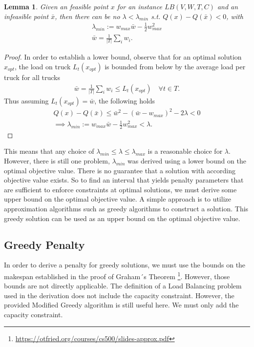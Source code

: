 \documentclass[12pt]{article}
\newtheorem{lemma}[theorem]{Lemma}
\begin{document}
\begin{lemma}
Given an feasible point $x$ for an instance $LB(V, W, T, C)$ and an infeasible point $\bar{x}$, then there can be no $\lambda < \lambda_{min}$ s.t. $Q(x) - Q(\bar{x}) < 0$, with
\begin{gather}
\lambda_{min} := w_{max}\bar{w} - \frac{1}{2} w_{max}^2 \\
\bar{w} = \frac{1}{|T|} \sum_{i} w_i.
\end{gather}
\end{lemma}
\begin{proof}
In order to establish a lower bound, observe that for an  optimal solution $x_{opt}$, the load on truck $L_t(x_{opt})$  is bounded from below by the average load per truck for all trucks
\begin{gather*}
\bar{w} = \frac{1}{|T|} \sum_{i} w_i \leq L_t(x_{opt}) \quad \forall t \in T.
\end{gather*}
Thus assuming $L_t(x_{opt}) = \bar{w}$, the following holds
\begin{gather*}
Q(x) - Q(\bar{x}) \leq \bar{w}^2 - (\bar{w} - w_{max})^2 - 2\lambda < 0 \\
\implies \lambda_{min} := w_{max}\bar{w} - \frac{1}{2} w_{max}^2 < \lambda.
\end{gather*}

\end{proof}


\noindent
This means that any choice of $\lambda_{min} \leq \lambda \leq \lambda_{max}$ is a reasonable choice for $\lambda$.
However, there is still one problem, $\lambda_{min}$ was derived using a lower bound on the optimal objective value.
There is no guarantee that a solution with according objective value exists.
So to find an interval that yields penalty parameters that are sufficient to enforce constraints at optimal solutions, we must derive some upper bound on the optimal objective value.
A simple approach is to utilize approximation algorithms such as greedy algorithms to construct a solution.
This greedy solution can be used as an upper bound on the optimal objective value.
 
\subsection{Greedy Penalty}
In order to derive a penalty for greedy solutions, we must use the bounds on the makespan established in the proof of Graham´s Theorem \footnote{\url{https://otfried.org/courses/cs500/slides-approx.pdf}}.
However, those bounds are not directly applicable.
The definition of a Load Balancing problem used in the derivation does not include the capacity constraint.
However, the provided Modified Greedy algorithm is still useful here.
We must only add the capacity constraint.
\end{document}
